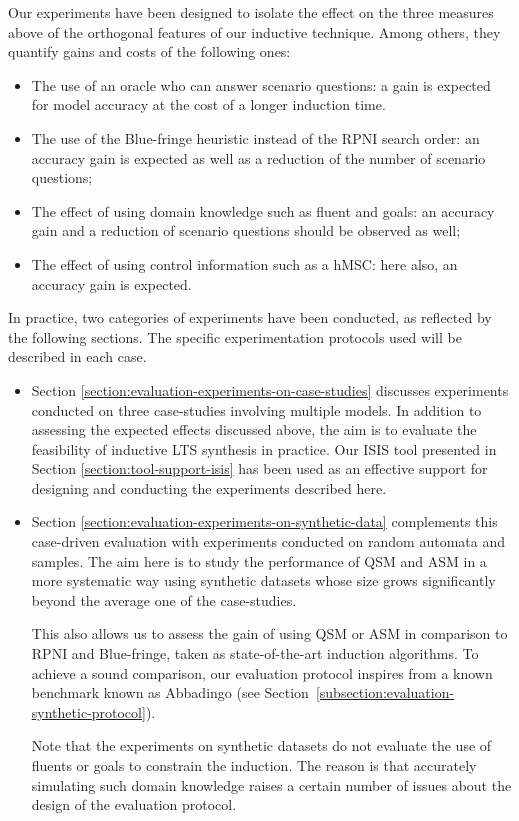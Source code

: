 Our experiments have been designed to isolate the effect on the three measures above of the orthogonal features of our inductive technique. Among others, they quantify gains and costs of the following ones:
\begin{itemize}
\item The use of an oracle who can answer scenario questions: a gain is expected for model accuracy at the cost of a longer induction time.
\item The use of the Blue-fringe heuristic instead of the RPNI search order: an accuracy gain is expected as well as a reduction of the number of scenario questions;
\item The effect of using domain knowledge such as fluent and goals: an accuracy gain and a reduction of scenario questions should be observed as well;
\item The effect of using control information such as a hMSC: here also, an accuracy gain is expected.
\end{itemize}

In practice, two categories of experiments have been conducted, as reflected by the following sections. The specific experimentation protocols used will be described in each case.
\begin{itemize}

\item Section \ref{section:evaluation-experiments-on-case-studies} discusses experiments conducted on three case-studies involving multiple models. In addition to assessing the expected effects discussed above, the aim is to evaluate the feasibility of inductive LTS synthesis in practice. Our ISIS tool presented in Section \ref{section:tool-support-isis} has been used as an effective support for designing and conducting the experiments described here.

\item Section \ref{section:evaluation-experiments-on-synthetic-data} complements this case-driven evaluation with experiments conducted on random automata and samples. The aim here is to study the performance of QSM and ASM in a more systematic way using synthetic datasets whose size grows significantly beyond the average one of the case-studies. 

This also allows us to assess the gain of using QSM or ASM in comparison to RPNI and Blue-fringe, taken as state-of-the-art induction algorithms. To achieve a sound comparison, our evaluation protocol inspires from a known benchmark known as Abbadingo \cite{Lang:1998} (see Section~\ref{subsection:evaluation-synthetic-protocol}). 

Note that the experiments on synthetic datasets do not evaluate the use of fluents or goals to constrain the induction. The reason is that accurately simulating such domain knowledge raises a certain number of issues about the design of the evaluation protocol.

\end{itemize}

